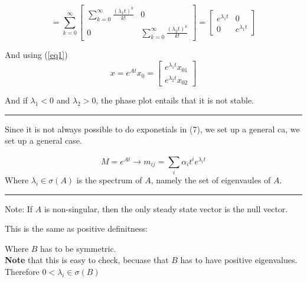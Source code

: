 \documentclass[a4paper]{article}
\begin{document}
\begin{equation}
 = \sum_{k=0}^{\infty}{\begin{bmatrix}
		\sum_{k=0}^{\infty}{\frac{(\lambda_1t)^{k}}{k!}} & 0 \\
	0 & \sum_{k=0}^{\infty}{\frac{(\lambda_2t)^{k}}{k!}}
\end{bmatrix} } = \begin{bmatrix}
e^{\lambda_1t} & 0 \\
0 & e^{\lambda_1t} 
\end{bmatrix}
\end{equation}

And using (\ref{eq1})
\begin{equation}
x = e^{At} x_0 = \begin{bmatrix}
e^{\lambda_1t} x_{01} \\
e^{\lambda_2t} x_{02}
\end{bmatrix} 
\end{equation}

And if $ \lambda_1  < 0$ and $ \lambda_2 > 0$, the phase plot entails that it is not stable. 

\vspace{5pt}
\hrule
\vspace{5pt}
Since it is not always possible to do exponetials in (7), we set up a general ca, we set up a general case.

\begin{equation}
	M =  e^{At} \rightarrow m_{ij} = \sum_{i}^{}{\alpha_i t^{i} e^{\lambda_i t}} 
\end{equation}
Where $ \lambda_i \in \sigma(A) $ is the spectrum of $ A $, namely the set of eigenvaules of  $ A $.

\vspace{5pt}
\hrule
\vspace{5pt}
\begin{center}
\end{center}

Note: If  $ A $ is non-singular, then the only steady state vector is the null vector.

This is the same as positive definitness:
\begin{center}
\end{center}
Where $ B $ has to be symmetric.\\ \textbf{Note} that this is easy to check, becuase that $ B $ has to have positive eigenvalues. Therefore  $ 0 < \lambda_i  \in \sigma(B) $ 
\end{document}
